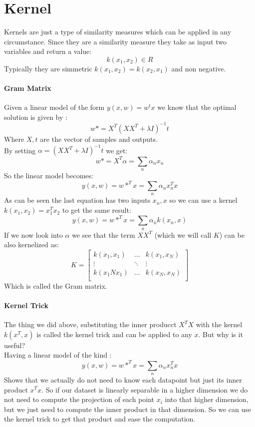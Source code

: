 \section{Kernel}
Kernels are just a type of similarity measures which can be applied in any circumstance. Since they are a similarity measure they take as input two variables and return a value:
$$k(x_1,x_2)\in R$$
Typically they are simmetric $k(x_1,x_2)=k(x_2,x_1)$ and non negative.

\paragraph{Gram Matrix}
Given a  linear model of the form $y(x,w)=w^tx$ we know that the optimal solution is given by :
$$w*=X^T(XX^T+\lambda I)^{-1}t$$
Where $X,t$ are the vector of samples and outputs.\\
By setting $\alpha=(XX^T+\lambda I)^{-1}t$ we get:
$$w*=X^T\alpha=\sum_n\alpha_nx_n$$
So the linear model becomes:
$$y(x,w)=w*^Tx=\sum_n\alpha_nx^T_nx$$
As can be seen the last equation has two inputs $x_n,x$ so we can use a kernel $k(x_1,x_2)=x_1^Tx_2$ to get the same result:
$$y(x,w)=w*^Tx=\sum_n\alpha_n k(x_n,x)$$
If we now look into $\alpha$ we see that the term $XX^T$ (which we will  call $K$) can be also kernelized as:
$$K=
\begin{bmatrix}
k(x_1,x_1) & \dots & k(x_1,x_N)\\
\vdots & \ddots & \vdots\\
k(x_1Nx_1) & \dots & k(x_N,x_N)\\
\end{bmatrix}
$$
Which is called the Gram matrix.

\paragraph{Kernel Trick}
The thing we did above, substituting the inner producct $X^TX$ with the kernel $k(x^T,x)$ is called the kernel trick and can be applied to any $x$. But why is it useful?\\
Having a linear model of the kind :
$$y(x,w)=w*^Tx=\sum_n\alpha_nx^T_nx$$
Shows that we actually do not need to know each datapoint but just its inner product $x^Tx$. So if our dataset is linearly separable in a higher dimension we do not need to compute the projection of each point $x_i$ into that higher dimension, but we just need to compute the inner product in that dimension. So we can use the kernel trick to get that product and ease the computation.